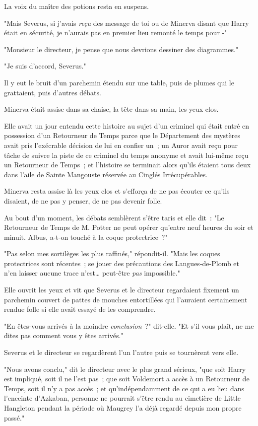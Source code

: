 La voix du maître des potions resta en suspens.

"Mais Severus, si j'avais \emph{reçu} des message de toi ou de Minerva disant que Harry était en sécurité, je n'aurais pas en premier lieu remonté le temps pour -"

"Monsieur le directeur, je pense que nous devrions dessiner des diagrammes."

"Je suis d'accord, Severus."

Il y eut le bruit d'un parchemin étendu sur une table, puis de plumes qui le grattaient, puis d'autres débats.

Minerva était assise dans sa chaise, la tête dans sa main, les yeux clos.

Elle avait un jour entendu cette histoire au sujet d'un criminel qui était entré en possession d'un Retourneur de Temps parce que le Département des mystères avait pris l'exécrable décision de lui en confier un~; un Auror avait reçu pour tâche de suivre la piste de ce criminel du temps anonyme et avait lui-même reçu un Retourneur de Temps~; et l'histoire se terminait alors qu'ils étaient tous deux dans l'aile de Sainte Mangouste réservée au Cinglés Irrécupérables.

Minerva resta assise là les yeux clos et s'efforça de ne pas écouter ce qu'ils disaient, de ne pas y penser, de ne pas devenir folle.

Au bout d'un moment, les débats semblèrent s'être taris et elle dit~: "Le Retourneur de Temps de M. Potter ne peut opérer qu'entre neuf heures du soir et minuit. Albus, a-t-on touché à la coque protectrice~?"

"Pas selon mes sortilèges les plus raffinés," répondit-il. "Mais les coques protectrices sont récentes~; se jouer des précautions des Langues-de-Plomb et n'en laisser aucune trace n'est… peut-être \emph{pas} impossible."

Elle ouvrit les yeux et vit que Severus et le directeur regardaient fixement un parchemin couvert de pattes de mouches entortillées qui l'auraient certainement rendue folle si elle avait essayé de les comprendre.

"En êtes-vous arrivés à la moindre \emph{conclusion}~?" dit-elle. "Et s'il vous plaît, ne me dites pas comment vous y êtes arrivés."

Severus et le directeur se regardèrent l'un l'autre puis se tournèrent vers elle.

"Nous avons conclu," dit le directeur avec le plus grand sérieux, "que soit Harry est impliqué, soit il ne l'est pas~; que soit Voldemort a accès à un Retourneur de Temps, soit il n'y a pas accès~; et qu'indépendamment de ce qui a eu lieu dans l'enceinte d'Azkaban, personne ne pourrait s'être rendu au cimetière de Little Hangleton pendant la période où Maugrey l'a déjà regardé depuis mon propre passé."

